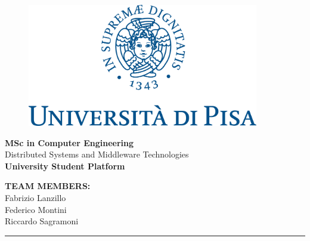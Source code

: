 \begin{titlepage}
    \begin{figure}[t]
    	\centering\includegraphics[width=0.9\textwidth]{logos/logo_unipi.png}
    	\vspace{10mm}
    \end{figure}
    
    \begin{center}
        \LARGE{\bf  MSc in Computer Engineering }\\
    	\vspace{5mm}
    	{\LARGE{Distributed Systems and Middleware Technologies}}\\
    	\vspace{10mm}
    	{\LARGE{\bf University Student Platform}}\\
    \end{center}
    
    \vspace{28mm}
    
    \begin{minipage}[t]{1\textwidth}\raggedleft
    	\LARGE{\bf TEAM MEMBERS:\\ }
    	\vspace{5mm}
    	Fabrizio Lanzillo\\
            Federico Montini\\
            Riccardo Sagramoni\\
    \end{minipage}
    
    \vspace{15mm}
    \vspace{3mm}
    \hrule
    \vspace{8mm}
    

\end{titlepage}

